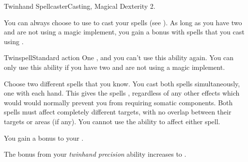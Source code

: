   \begin{magicalfeat}{Twinhand Spellcaster}{Casting, Magical}
    \featpre Dexterity 2.

     You can always choose to use  to cast your spells (see ).
    As long as you have two  and are not using a magic implement, you gain a   bonus with spells that you cast using .

    \begin{magicalactiveability}{Twinspell}{Standard action}
      \abilitycost One , and you \briefly can't use this ability again.
      \rankline
      You can only use this ability if you have two  and are not using a magic implement.

      Choose two different spells that you know.
      You cast both spells simultaneously, one with each hand.
      This gives the spells , regardless of any other effects which would would normally prevent you from requiring somatic components.
      Both spells must affect completely different targets, with no overlap between their targets or areas (if any).
      You cannot use the  ability to affect either spell.
    \end{magicalactiveability}

     You gain a  bonus to your .

     The bonus from your \textit{twinhand precision} ability increases to .
  \end{magicalfeat}

